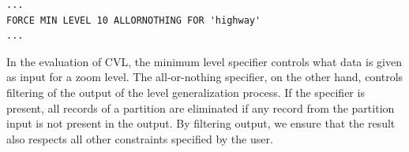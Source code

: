 \begin{lstlisting}
...
FORCE MIN LEVEL 10 ALLORNOTHING FOR 'highway'
... 
\end{lstlisting}

In the evaluation of CVL, the minimum level specifier controls what data is given as input for a zoom level. The all-or-nothing specifier, on the other hand, controls filtering of the output of the level generalization process. If the specifier is present, all records of a partition are eliminated if any record from the partition input is not present in the output. By filtering output, we ensure that the result also respects all other constraints specified by the user. 


%
%

